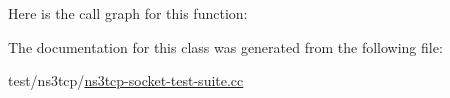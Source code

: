 Here is the call graph for this function\+:




The documentation for this class was generated from the following file\+:\begin{DoxyCompactItemize}
\item 
test/ns3tcp/\hyperlink{ns3tcp-socket-test-suite_8cc}{ns3tcp-\/socket-\/test-\/suite.\+cc}\end{DoxyCompactItemize}
